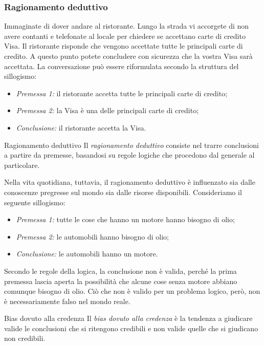 \documentclass[a4paper]{article}
\begin{document}
\subsubsection{Ragionamento deduttivo}
Immaginate di dover andare al ristorante. Lungo la strada vi accorgete di non avere contanti e telefonate al locale per chiedere se accettano carte di credito Visa. Il ristorante risponde che vengono accettate tutte le principali carte di credito. A questo punto potete concludere con sicurezza che la vostra Visa sarà accettata.
La conversazione può essere riformulata secondo la struttura del sillogismo:
\begin{itemize}
    \item \emph{Premessa 1:} il ristorante accetta tutte le principali carte di credito;
    \item \emph{Premessa 2:} la Visa è una delle principali carte di credito;
    \item \emph{Conclusione:} il ristorante accetta la Visa.
\end{itemize}
\begin{snippetdefinition}{Ragionamento deduttivo}
    Il \emph{ragionamento deduttivo} consiste nel trarre conclusioni a partire da premesse, basandosi su regole logiche che procedono dal generale al particolare.
\end{snippetdefinition}
Nella vita quotidiana, tuttavia, il ragionamento deduttivo è influenzato sia dalle conoscenze pregresse sul mondo sia dalle risorse disponibili.
Consideriamo il seguente sillogismo:
\begin{itemize}
    \item \emph{Premessa 1:} tutte le cose che hanno un motore hanno bisogno di olio;
    \item \emph{Premessa 2:} le automobili hanno bisogno di olio;
    \item \emph{Conclusione:} le automobili hanno un motore.
\end{itemize}
Secondo le regole della logica, la conclusione non è valida, perché la prima premessa lascia aperta la possibilità che alcune cose senza motore abbiano comunque bisogno di olio. Ciò che non è valido per un problema logico, però, non è necessariamente falso nel mondo reale.
\begin{snippetdefinition}{Bias dovuto alla credenza}
    Il \emph{bias dovuto alla credenza} è la tendenza a giudicare valide le conclusioni che si ritengono credibili e non valide quelle che si giudicano non credibili.
\end{snippetdefinition}
\end{document}
